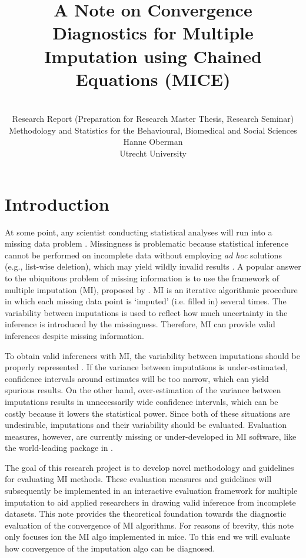\documentclass[article]{jss}
\author{\\Research Report (Preparation for Research Master Thesis, Research Seminar) \\ Methodology and Statistics for the Behavioural, Biomedical and Social Sciences \AND Hanne Oberman\\Utrecht University}
\title{A Note on Convergence Diagnostics for Multiple Imputation using Chained Equations (MICE)}
\begin{document}

\section{Introduction} \label{sec:intro} %

At some point, any scientist conducting statistical analyses will run into a missing data problem \citep{alli02}. Missingness is problematic because statistical inference cannot be performed on incomplete data without employing \emph{ad hoc} solutions (e.g., list-wise deletion), which may yield wildly invalid results \citep{buur18}. A popular answer to the ubiquitous problem of missing information is to use the framework of multiple imputation (MI), proposed by \cite{rubin87}. MI is an iterative algorithmic procedure in which each missing data point is `imputed' (i.e. filled in) several times. The variability between imputations is used to reflect how much uncertainty in the inference is introduced by the missingness. Therefore, MI can provide valid inferences despite missing information. 

To obtain valid inferences with MI, the variability between imputations should be properly represented \citep{rubin87, buur18}. If the variance between imputations is under-estimated, confidence intervals around estimates will be too narrow, which can yield spurious results. On the other hand, over-estimation of the variance between imputations results in unnecessarily wide confidence intervals, which can be costly because it lowers the statistical power. Since both of these situations are undesirable, imputations and their variability should be evaluated. Evaluation measures, however, are currently missing or under-developed in MI software, like the world-leading  package \citep{mice} in  \citep{R}. %

The goal of this research project is to develop novel methodology and guidelines for evaluating MI methods. These evaluation measures and guidelines will subsequently be implemented in an interactive evaluation framework for multiple imputation to aid applied researchers in drawing valid inference from incomplete datasets. This note provides the theoretical foundation towards the diagnostic evaluation of the convergence of MI algorithms. %
For reasons of brevity, this note only focuses ion the MI algo implemented in mice. %
To this end we will evaluate how convergence of the imputation algo can be diagnosed.
\end{document}
